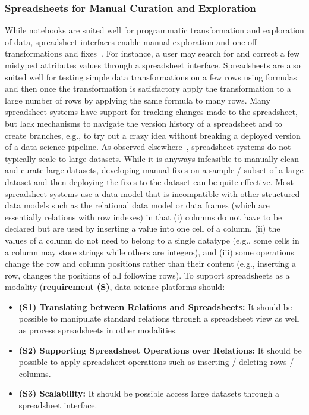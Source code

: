\subsubsection{Spreadsheets for Manual Curation and Exploration}
\label{sec:spre-manu-curat}
%
While notebooks are suited well for programmatic transformation and exploration of data, spreadsheet interfaces enable manual exploration and one-off transformations and fixes~\cite{FG16}. For instance, a user may search for and correct a few mistyped attributes values through a spreadsheet interface. Spreadsheets are also suited well for testing simple data transformations on a few rows using formulas and then once the transformation is satisfactory apply the transformation to a large number of rows by applying the same formula to many rows. Many spreadsheet systems have support for tracking changes made to the spreadsheet, but lack mechanisms to navigate the version history of a spreadsheet and to create branches, e.g., to try out a crazy idea without breaking a deployed version of a data science pipeline. As observed elsewhere~\cite{bendre-19-fhs}, spreadsheet systems do not typically scale to large datasets. While it is anyways infeasible to manually clean and curate large datasets, developing manual fixes on a sample / subset of a large dataset and then deploying the fixes to the dataset can be quite effective. Most spreadsheet systems use a data model that is incompatible with other structured data models such as the relational data model or data frames (which are essentially relations with row indexes) in that (i) columns do not have to be declared but are used by inserting a value into one cell of a column, (ii) the values of a column do not need to belong to a single datatype (e.g., some cells in a column may store strings while others are integers), and (iii) some operations  change the row and column positions rather than their content (e.g., inserting a row, changes the positions of all following rows). To support spreadsheets as a modality (\textbf{requirement (S)}, data science platforms should:
\begin{itemize}
\item \textbf{(S1) Translating between Relations and Spreadsheets:} It should be possible to manipulate standard relations through a spreadsheet view as well as process spreadsheets in other modalities.
\item \textbf{(S2) Supporting Spreadsheet Operations over Relations:} It should be possible to apply spreadsheet operations such as inserting / deleting rows / columns.
\item \textbf{(S3) Scalability:} It should be possible access large datasets through a spreadsheet interface.
\end{itemize}

